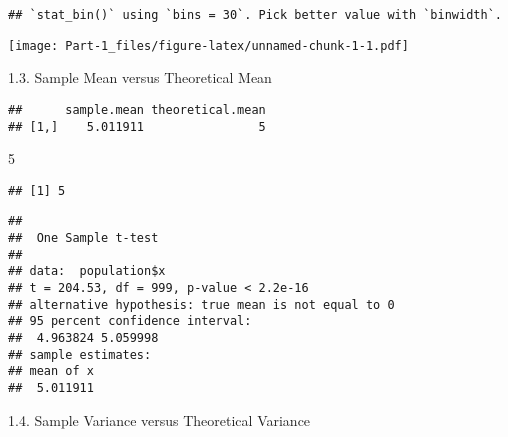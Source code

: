 \documentclass[
]{article}
\newenvironment{Shaded}{\begin{snugshade}}{\end{snugshade}}
\newcommand{\CommentTok}[1]{\textcolor[rgb]{0.56,0.35,0.01}{\textit{#1}}}
\newcommand{\DecValTok}[1]{\textcolor[rgb]{0.00,0.00,0.81}{#1}}
\newcommand{\KeywordTok}[1]{\textcolor[rgb]{0.13,0.29,0.53}{\textbf{#1}}}
\newcommand{\NormalTok}[1]{#1}
\newcommand{\OperatorTok}[1]{\textcolor[rgb]{0.81,0.36,0.00}{\textbf{#1}}}
\newcommand{\StringTok}[1]{\textcolor[rgb]{0.31,0.60,0.02}{#1}}
\begin{document}
\begin{verbatim}
## `stat_bin()` using `bins = 30`. Pick better value with `binwidth`.
\end{verbatim}

\texttt{[image: Part-1\_files/figure-latex/unnamed-chunk-1-1.pdf]}

1.3. Sample Mean versus Theoretical Mean

\begin{Shaded}
\end{Shaded}

\begin{verbatim}
##      sample.mean theoretical.mean
## [1,]    5.011911                5
\end{verbatim}

\begin{Shaded}
\begin{Highlighting}[]
              \DecValTok{5}
\end{Highlighting}
\end{Shaded}

\begin{verbatim}
## [1] 5
\end{verbatim}

\begin{Shaded}
\end{Shaded}

\begin{verbatim}
## 
##  One Sample t-test
## 
## data:  population$x
## t = 204.53, df = 999, p-value < 2.2e-16
## alternative hypothesis: true mean is not equal to 0
## 95 percent confidence interval:
##  4.963824 5.059998
## sample estimates:
## mean of x 
##  5.011911
\end{verbatim}

1.4. Sample Variance versus Theoretical Variance

\begin{Shaded}
\end{Shaded}
\end{document}
